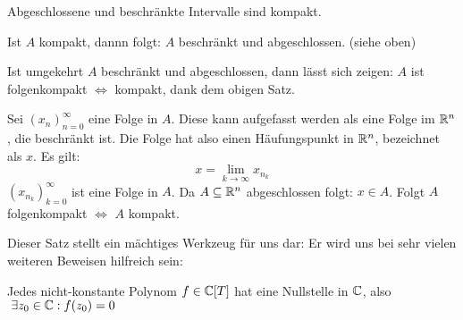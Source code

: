 \documentclass[main.tex]{subfiles}
\begin{document}
\begin{Korollar}
  Abgeschlossene und beschränkte Intervalle sind kompakt.
\end{Korollar}

\begin{Beweis}
  Ist $A$ kompakt, dannn folgt: $A$ beschränkt und abgeschlossen. (siehe oben)

  Ist umgekehrt $A$ beschränkt und abgeschlossen, dann lässt sich zeigen: $A$ ist folgenkompakt $\Leftrightarrow$ kompakt, dank dem obigen Satz.

  Sei $(x_n)_{n = 0}^\infty$ eine Folge in $A$. Diese kann aufgefasst werden als eine Folge im $\mathbb{R}^n$, die beschränkt ist. Die Folge hat also einen Häufungspunkt in $\mathbb{R}^n$, bezeichnet als $x$. Es gilt:
  $$x = \lim \limits_{k \to \infty} x_{n_k}$$
  $(x_{n_k})_{k = 0}^\infty$ ist eine Folge in $A$. Da $A \subseteq \mathbb{R}^n$ abgeschlossen folgt: $x \in A$. Folgt $A$ folgenkompakt $\Leftrightarrow$ $A$ kompakt.
\end{Beweis}

Dieser Satz stellt ein mächtiges Werkzeug für uns dar: Er wird uns bei sehr vielen weiteren Beweisen hilfreich sein:
\begin{Theorem}
  Jedes nicht-konstante Polynom $f \in \mathbb{C}[T]$ hat eine Nullstelle in $\mathbb{C}$, also $\;\exists z_0 \in \mathbb{C} : f(z_0) = 0$
\end{Theorem}
\end{document}

